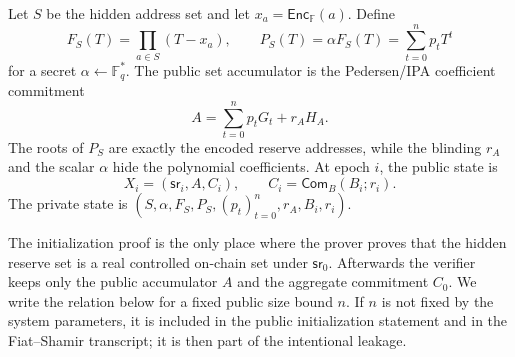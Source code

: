 \documentclass[runningheads]{llncs}
\newcommand{\F}{\mathbb{F}}
\newcommand{\Enc}{\mathsf{Enc}}
\newcommand{\Com}{\mathsf{Com}}
\newcommand{\sr}{\mathsf{sr}}
\begin{document}
Let \(S\) be the hidden address set and let \(x_a=\Enc_{\F}(a)\).  Define
\[
        F_S(T)=\prod_{a\in S}(T-x_a),\qquad P_S(T)=\alpha F_S(T)=\sum_{t=0}^np_tT^t
\]
for a secret \(\alpha\leftarrow\F_q^*\).  The public set accumulator is the Pedersen/IPA coefficient commitment
\[
        A=\sum_{t=0}^np_tG_t+r_AH_A.
\]
The roots of \(P_S\) are exactly the encoded reserve addresses, while the blinding \(r_A\) and the scalar \(\alpha\) hide the polynomial coefficients.  At epoch \(i\), the public state is
\[
        X_i=(\sr_i,A,C_i),\qquad C_i=\Com_B(B_i;r_i).
\]
The private state is \((S,\alpha,F_S,P_S,(p_t)_{t=0}^n,r_A,B_i,r_i)\).

The initialization proof is the only place where the prover proves that the hidden reserve set is a real controlled on-chain set under \(\sr_0\).  Afterwards the verifier keeps only the public accumulator \(A\) and the aggregate commitment \(C_0\).  We write the relation below for a fixed public size bound \(n\).  If \(n\) is not fixed by the system parameters, it is included in the public initialization statement and in the Fiat--Shamir transcript; it is then part of the intentional leakage.
\end{document}
